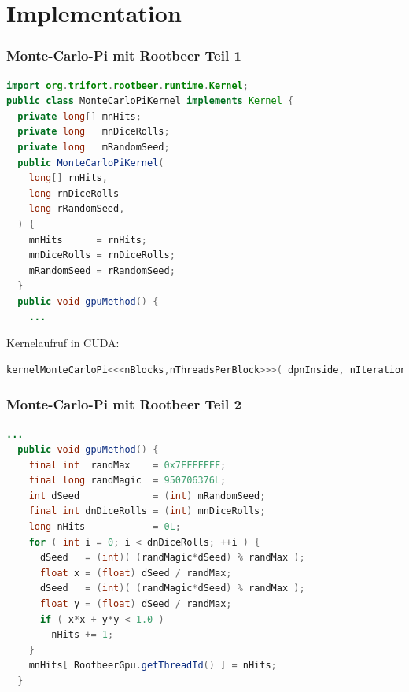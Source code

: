 \section{Implementation}



\begin{frame}[fragile]
    \frametitle{Monte-Carlo-Pi mit Rootbeer Teil 1}
    \begin{lstlisting}[language=Java]
import org.trifort.rootbeer.runtime.Kernel;
public class MonteCarloPiKernel implements Kernel {
  private long[] mnHits;
  private long   mnDiceRolls;
  private long   mRandomSeed;
  public MonteCarloPiKernel(
    long[] rnHits,
    long rnDiceRolls
    long rRandomSeed,
  ) {
    mnHits      = rnHits;
    mnDiceRolls = rnDiceRolls;
    mRandomSeed = rRandomSeed;
  }
  public void gpuMethod() {
    ...
\end{lstlisting}\vspace{-1.5\baselineskip}
Kernelaufruf in CUDA:
\begin{lstlisting}[language=C++]
kernelMonteCarloPi<<<nBlocks,nThreadsPerBlock>>>( dpnInside, nIterationsPerThread, seed );
\end{lstlisting}
\end{frame}


\begin{frame}[fragile]
    \frametitle{Monte-Carlo-Pi mit Rootbeer Teil 2}
    \begin{lstlisting}[language=Java]
  ...
  public void gpuMethod() {
    final int  randMax    = 0x7FFFFFFF;
    final long randMagic  = 950706376L;
    int dSeed             = (int) mRandomSeed;
    final int dnDiceRolls = (int) mnDiceRolls;
    long nHits            = 0L;
    for ( int i = 0; i < dnDiceRolls; ++i ) {
      dSeed   = (int)( (randMagic*dSeed) % randMax );
      float x = (float) dSeed / randMax;
      dSeed   = (int)( (randMagic*dSeed) % randMax );
      float y = (float) dSeed / randMax;
      if ( x*x + y*y < 1.0 )
        nHits += 1;
    }
    mnHits[ RootbeerGpu.getThreadId() ] = nHits;
  }
\end{lstlisting}\vspace{-1.5\baselineskip}
\end{frame}


